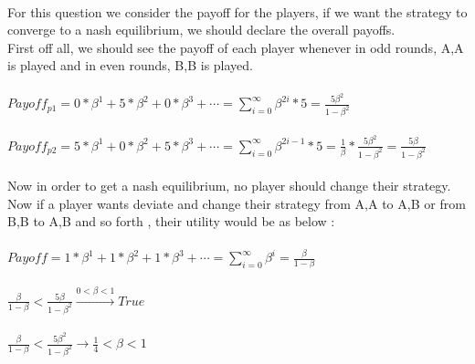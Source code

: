 \\
\begin{latin}
  For this question we consider the payoff for the players, if we want the strategy to converge to a nash equilibrium,
  we should declare the overall payoffs.\\
  First off all, we should see the payoff of each player whenever in odd rounds, A,A is played and in even rounds, B,B is played.
  \\\\
  $Payoff_{p1} =0 * \beta^1 + 5 * \beta^2 + 0*\beta^3 + \cdots =  \sum_{i=0}^{\infty} \beta^{2i} * 5 = \frac{5\beta^2}{1-\beta^2}$\\\\
  $Payoff_{p2} =5 * \beta^1 + 0 * \beta^2 + 5*\beta^3 + \cdots = \sum_{i=0}^{\infty} \beta^{2i-1} * 5 = \frac{1}{\beta} * \frac{5\beta^2}{1-\beta^2} = \frac{5\beta}{1-\beta^2}$\\\\
  Now in order to get a nash equilibrium, no player should change their strategy. Now if a player wants deviate and change their strategy from A,A to A,B or from B,B to A,B and so forth
  , their utility would be as below : \\\\
  $Payoff = 1 * \beta^1 + 1 * \beta^2 + 1*\beta^3 + \cdots =  \sum_{i=0}^{\infty} \beta^{i} =\frac{\beta}{1-\beta}$\\\\
  $\frac{\beta}{1-\beta} < \frac{5\beta}{1-\beta^2} \xrightarrow[]{0<\beta<1} True$\\\\
  $\frac{\beta}{1-\beta} < \frac{5\beta^2}{1-\beta^2} \rightarrow \frac{1}{4}<\beta<1$
  \\\\
\end{latin}
